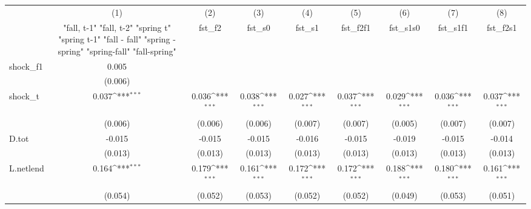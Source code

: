 {
\def\sym#1{\ifmmode^{#1}\else\(^{#1}\)\fi}
\begin{tabular}{l*{8}{c}}
\toprule
            &\multicolumn{1}{c}{(1)}&\multicolumn{1}{c}{(2)}&\multicolumn{1}{c}{(3)}&\multicolumn{1}{c}{(4)}&\multicolumn{1}{c}{(5)}&\multicolumn{1}{c}{(6)}&\multicolumn{1}{c}{(7)}&\multicolumn{1}{c}{(8)}\\
            &\multicolumn{1}{c}{  "fall, t-1" "fall, t-2" "spring t" "spring t-1"  "fall - fall" "spring - spring" "spring-fall" "fall-spring" }&\multicolumn{1}{c}{fst\_f2}&\multicolumn{1}{c}{fst\_s0}&\multicolumn{1}{c}{fst\_s1}&\multicolumn{1}{c}{fst\_f2f1}&\multicolumn{1}{c}{fst\_s1s0}&\multicolumn{1}{c}{fst\_s1f1}&\multicolumn{1}{c}{fst\_f2s1}\\
\midrule
shock\_f1    &       0.005         &                     &                     &                     &                     &                     &                     &                     \\
            &     (0.006)         &                     &                     &                     &                     &                     &                     &                     \\
\addlinespace
shock\_t     &       0.037\sym{***}&       0.036\sym{***}&       0.038\sym{***}&       0.027\sym{***}&       0.037\sym{***}&       0.029\sym{***}&       0.036\sym{***}&       0.037\sym{***}\\
            &     (0.006)         &     (0.006)         &     (0.006)         &     (0.007)         &     (0.007)         &     (0.005)         &     (0.007)         &     (0.007)         \\
\addlinespace
D.tot       &      -0.015         &      -0.015         &      -0.015         &      -0.016         &      -0.015         &      -0.019         &      -0.015         &      -0.014         \\
            &     (0.013)         &     (0.013)         &     (0.013)         &     (0.013)         &     (0.013)         &     (0.013)         &     (0.013)         &     (0.013)         \\
\addlinespace
L.netlend   &       0.164\sym{***}&       0.179\sym{***}&       0.161\sym{***}&       0.172\sym{***}&       0.172\sym{***}&       0.188\sym{***}&       0.180\sym{***}&       0.161\sym{***}\\
            &     (0.054)         &     (0.052)         &     (0.053)         &     (0.052)         &     (0.052)         &     (0.049)         &     (0.053)         &     (0.051)         \\

\end{tabular}}
